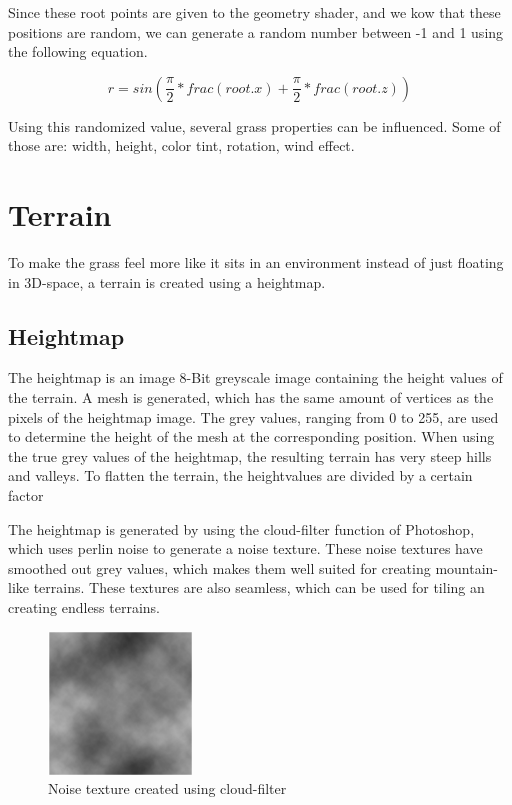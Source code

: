 \documentclass[conference]{acmsiggraph}
\begin{document}
Since these root points are given to the geometry shader, and we kow that these positions are random, we can generate a random number between -1 and 1 using the following equation.

\begin{equation}
r = sin(\frac{\pi}2 * frac(root.x) + \frac{\pi}2 * frac(root.z))
\end{equation}

Using this randomized value, several grass properties can be influenced. Some of those are: width, height, color tint, rotation, wind effect.

\section{Terrain}
To make the grass feel more like it sits in an environment instead of just floating in 3D-space, a terrain is created using a heightmap.

\subsection{Heightmap}
The heightmap is an image 8-Bit greyscale image containing the height values of the terrain. A mesh is generated, which has the same amount of vertices as the pixels of the heightmap image. The grey values, ranging from 0 to 255, are used to determine the height of the mesh at the corresponding position. When using the true grey values of the heightmap, the resulting terrain has very steep hills and valleys. To flatten the terrain, the heightvalues are divided by a certain factor

The heightmap is generated by using the cloud-filter function of Photoshop, which uses perlin noise to generate a noise texture. These noise textures have smoothed out grey values, which makes them well suited for creating mountain-like terrains. These textures are also seamless, which can be used for tiling an creating endless terrains.

 \begin{figure}[ht]
   \centering
   \includegraphics[width=1.5in]{images/heightmap}
   \caption{Noise texture created using cloud-filter}
 \end{figure}
\end{document}
